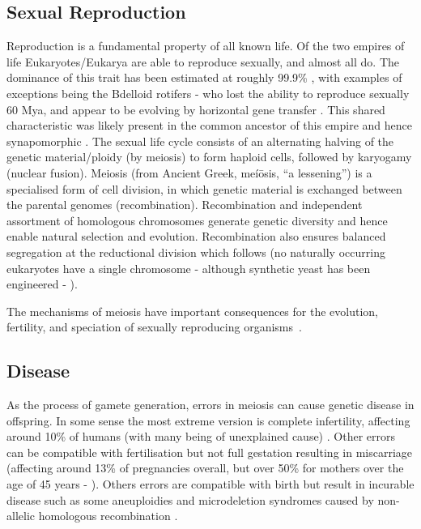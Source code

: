 \subsection{Sexual Reproduction}
Reproduction is a fundamental property of all known life. Of the two empires of life Eukaryotes/Eukarya are able to reproduce sexually, and almost all do. The dominance of this trait has been estimated at roughly 99.9\% \parencite{White1978Modes}, with examples of exceptions being the Bdelloid rotifers - who lost the ability to reproduce sexually 60 Mya, and appear to be evolving by horizontal gene transfer \parencite{Debortoli2016Genetic}. This shared characteristic was likely present in the common ancestor of this empire and hence synapomorphic \parencite{Bernstein2013Evolutionary}. The sexual life cycle consists of an alternating halving of the genetic material/ploidy (by meiosis) to form haploid cells, followed by karyogamy (nuclear fusion). Meiosis (from Ancient Greek, meíōsis, “a lessening”) is a specialised form of cell division, in which genetic material is exchanged between the parental genomes (recombination). Recombination and independent assortment of homologous chromosomes generate genetic diversity and hence enable natural selection and evolution. Recombination also ensures balanced segregation at the reductional division which follows (no naturally occurring eukaryotes have a single chromosome - although synthetic yeast has been engineered - \cite{Shao2018Creating}).

The mechanisms of meiosis have important consequences for the evolution, fertility, and speciation of sexually reproducing organisms~\parencite{Davies2016Reengineering,Hassold2007Origin}. 


\subsection{Disease}
As the process of gamete generation, errors in meiosis can cause genetic disease in offspring. In some sense the most extreme version is complete infertility, affecting around 10\% of humans (with many being of unexplained cause) \parencite{Datta2016Prevalence, Hamada2011Unexplained}. Other errors can be compatible with fertilisation but not full gestation resulting in miscarriage (affecting around 13\% of pregnancies overall, but over 50\% for mothers over the age of 45 years - \cite{Magnus2019Role}). Others errors are compatible with birth but result in incurable disease such as some aneuploidies \parencite{Hassold2007Origin} and microdeletion syndromes caused by non-allelic homologous recombination \parencite{Myers2008common}.


